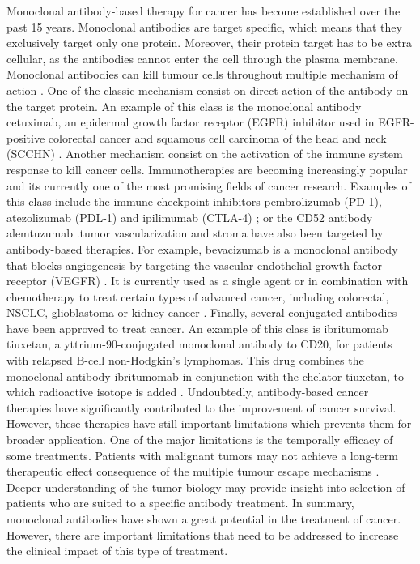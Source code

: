 \documentclass[11pt, b5paper,twoside]{tesi_upf}
\begin{document}
\par  Monoclonal antibody-based therapy for cancer has become established over the past 15 years. Monoclonal antibodies are target specific, which means that they exclusively target only one protein. Moreover, their protein target has to be extra cellular, as the antibodies cannot enter the cell through the plasma membrane. Monoclonal antibodies can kill tumour cells throughout multiple mechanism of action \cite{Scott2012}. One of the classic mechanism consist on direct action of the antibody on the target protein. An example of this class is the monoclonal antibody cetuximab, an epidermal growth factor receptor (EGFR) inhibitor used in EGFR-positive colorectal cancer \cite{Jonker2007} and squamous cell carcinoma of the head and neck (SCCHN) \cite{Tejani2010}. Another mechanism consist on the activation of the immune system response to kill cancer cells. Immunotherapies are becoming increasingly popular and its currently one of the most promising fields of cancer research.  Examples of this class include the immune checkpoint inhibitors  pembrolizumab (PD-1), atezolizumab (PDL-1) and ipilimumab (CTLA-4) \cite{Postow2015}; or the CD52 antibody alemtuzumab \cite{Demko2008}.tumor vascularization and stroma have also been targeted by antibody-based therapies. For example, bevacizumab is a monoclonal antibody that blocks angiogenesis by targeting the vascular endothelial growth factor receptor (VEGFR) \cite{Ferrara2004}. It is currently used as a single agent or in combination with chemotherapy to treat certain types of advanced cancer, including colorectal, NSCLC, glioblastoma or kidney cancer \cite{Keating2014}. Finally, several conjugated antibodies have been approved to treat cancer. An example of this class is ibritumomab tiuxetan, a yttrium-90-conjugated monoclonal antibody to CD20, for patients with relapsed B-cell non-Hodgkin's lymphomas. This drug combines the monoclonal antibody ibritumomab in conjunction with the chelator tiuxetan, to which radioactive isotope is added \cite{Witzig2002}. Undoubtedly, antibody-based cancer therapies have significantly contributed to the improvement of cancer survival. However, these therapies have still important limitations which prevents them for broader application. One of the major limitations is the temporally efficacy of some treatments. Patients with malignant tumors may not achieve a long-term therapeutic effect consequence of the multiple tumour escape mechanisms \cite{Scott2012}. Deeper understanding of the tumor biology may provide insight into selection of patients who are suited to a specific antibody treatment. In summary, monoclonal antibodies have shown a great potential in the treatment of cancer. However, there are important limitations that need to be addressed to increase the clinical impact of this type of treatment.  
\end{document}
